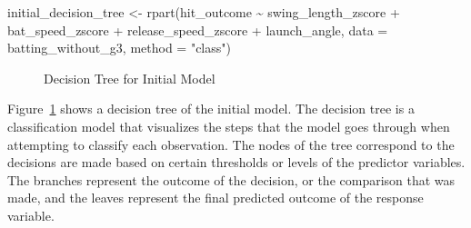 \documentclass[
  letterpaper,
  DIV=11,
  numbers=noendperiod]{scrartcl}
\newenvironment{Shaded}{\begin{snugshade}}{\end{snugshade}}
\newcommand{\AttributeTok}[1]{\textcolor[rgb]{0.40,0.45,0.13}{#1}}
\newcommand{\FunctionTok}[1]{\textcolor[rgb]{0.28,0.35,0.67}{#1}}
\newcommand{\NormalTok}[1]{\textcolor[rgb]{0.00,0.23,0.31}{#1}}
\newcommand{\OtherTok}[1]{\textcolor[rgb]{0.00,0.23,0.31}{#1}}
\newcommand{\SpecialCharTok}[1]{\textcolor[rgb]{0.37,0.37,0.37}{#1}}
\newcommand{\StringTok}[1]{\textcolor[rgb]{0.13,0.47,0.30}{#1}}
\begin{document}
\begin{Shaded}
\begin{Highlighting}[]
\NormalTok{initial\_decision\_tree }\OtherTok{\textless{}{-}} \FunctionTok{rpart}\NormalTok{(hit\_outcome }\SpecialCharTok{\textasciitilde{}} 
\NormalTok{                                 swing\_length\_zscore }\SpecialCharTok{+}
\NormalTok{                                 bat\_speed\_zscore }\SpecialCharTok{+}
\NormalTok{                                 release\_speed\_zscore }\SpecialCharTok{+}
\NormalTok{                                 launch\_angle,}
                               \AttributeTok{data =}\NormalTok{ batting\_without\_g3,}
                               \AttributeTok{method =} \StringTok{"class"}\NormalTok{)}
\end{Highlighting}
\end{Shaded}

\begin{figure}[H]


\caption{\label{fig-init-dec-tree}Decision Tree for Initial Model}

\end{figure}%

Figure~\ref{fig-init-dec-tree} shows a decision tree of the initial
model. The decision tree is a classification model that visualizes the
steps that the model goes through when attempting to classify each
observation. The nodes of the tree correspond to the decisions are made
based on certain thresholds or levels of the predictor variables. The
branches represent the outcome of the decision, or the comparison that
was made, and the leaves represent the final predicted outcome of the
response variable.
\end{document}
